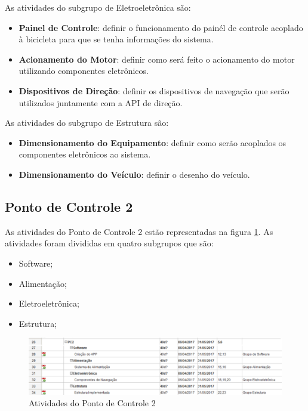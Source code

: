 \begin{apendicesenv}
	As atividades do subgrupo de Eletroeletrônica são:
	\begin{itemize}
		\item \textbf{Painel de Controle}: definir o funcionamento do painél de controle acoplado à bicicleta para que se tenha informações do sistema.
		\item \textbf{Acionamento do Motor}: definir como será feito o acionamento do motor utilizando componentes eletrônicos.
		\item \textbf{Dispositivos de Direção}: definir os dispositivos de navegação que serão utilizados juntamente com a API de direção.
	\end{itemize}

	As atividades do subgrupo de Estrutura são:
	\begin{itemize}
		\item \textbf{Dimensionamento do Equipamento}: definir como serão acoplados os componentes eletrônicos ao sistema.
		\item \textbf{Dimensionamento do Veículo}: definir o desenho do veículo.
	\end{itemize}

	\subsection{Ponto de Controle 2}
		As atividades do Ponto de Controle 2 estão representadas na figura \ref{img:PC2}. As atividades foram divididas em quatro subgrupos que são:

		\begin{itemize}
			\item Software;
			\item Alimentação;
			\item Eletroeletrônica;
			\item Estrutura;
		\end{itemize}	
		
		\graphicspath{{figuras/}}
			\begin{figure}[h!]
			\centering
			\includegraphics[scale=0.60]{PC2}
			\caption{Atividades do Ponto de Controle 2}
			\label{img:PC2}
			\end{figure}	
			

\end{apendicesenv}
